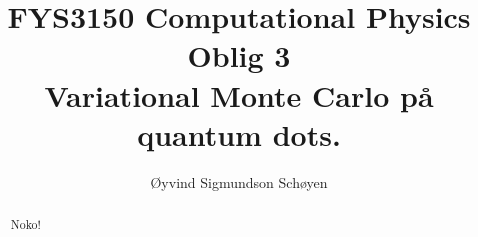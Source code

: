 \documentclass[11pt, a4paper]{article}
\theoremstyle{definition}
\begin{document}
\begin{titlepage}

  \title{\normalsize FYS3150 Computational Physics\\
  \vspace{10mm}
  \huge Oblig 3\\
  \vspace{10mm}
  \normalsize{\bf Variational Monte Carlo på quantum dots.}}

  \author{Øyvind Sigmundson Schøyen}

\end{titlepage}

\maketitle

\begin{abstract}
  Noko!
\end{abstract}
\end{document}
